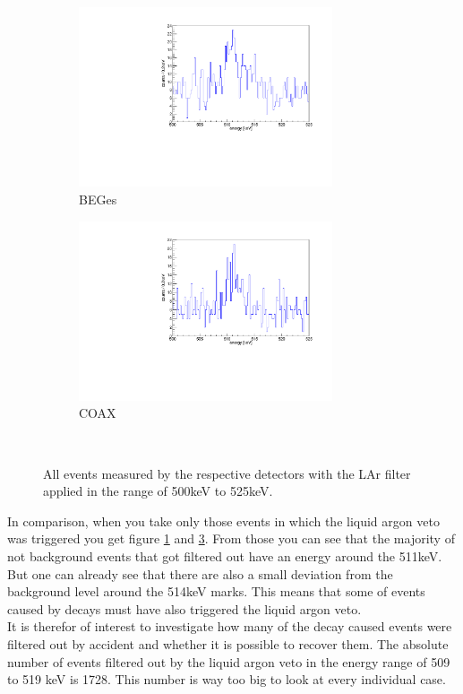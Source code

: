 \documentclass[encoding=utf8,british]{tumphthesis}
\begin{document}
\begin{figure}[t!]
	\centering
	\begin{subfigure}{.5\textwidth}
		\includegraphics[width=75mm]{./Bilder/AntiLArBEGe.pdf}
		\caption{BEGes}
		\label{fig:AntiLArBEGes}
	\end{subfigure}%
	\begin{subfigure}{.5\textwidth}
		\includegraphics[width=75mm]{./Bilder/AntiLArCOAX.pdf}
		\caption{COAX}
		\label{fig:AntiLArCOAX}
	\end{subfigure}
	\\
	\vspace{0.5cm}
	\caption{All events measured by the respective detectors with the LAr filter applied in the range of 500keV to 525keV.}
\end{figure}

In comparison, when you take only those events in which the liquid argon veto was triggered you get figure \ref{fig:AntiLArBEGes} and \ref{fig:AntiLArCOAX}.
From those you can see that the majority of not background events that got filtered out have an energy around the 511keV.
But one can already see that there are also a small deviation from the background level around the 514keV marks.
This means that some of events caused by \Kr decays must have also triggered the liquid argon veto.
\\

It is therefor of interest to investigate how many of the \Kr decay caused events were filtered out by accident and whether it is possible to recover them.
The absolute number of events filtered out by the liquid argon veto in the energy range of 509 to 519 keV is 1728.
This number is way too big to look at every individual case.
\\
\end{document}
